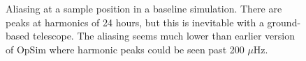 \begin{figure}
\label{fig:alias}
\caption{Aliasing at a sample position in a baseline simulation. There are peaks at harmonics of 24 hours, but this is inevitable with a ground-based telescope. The aliasing seems much lower than earlier version of OpSim where harmonic peaks could be seen past 200 $\mu$Hz.}
\end{figure}


